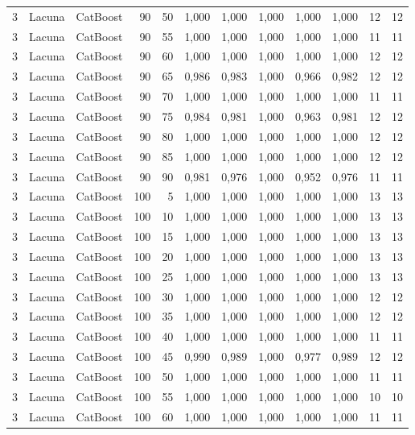 \begin{longtable}{@{}rllrrrrrrrrr@{}}
3 & Lacuna & CatBoost & 90 & 50 & 1,000 & 1,000 & 1,000 & 1,000 & 1,000 & 12 & 12 \\
3 & Lacuna & CatBoost & 90 & 55 & 1,000 & 1,000 & 1,000 & 1,000 & 1,000 & 11 & 11 \\
3 & Lacuna & CatBoost & 90 & 60 & 1,000 & 1,000 & 1,000 & 1,000 & 1,000 & 12 & 12 \\
3 & Lacuna & CatBoost & 90 & 65 & 0,986 & 0,983 & 1,000 & 0,966 & 0,982 & 12 & 12 \\
3 & Lacuna & CatBoost & 90 & 70 & 1,000 & 1,000 & 1,000 & 1,000 & 1,000 & 11 & 11 \\
3 & Lacuna & CatBoost & 90 & 75 & 0,984 & 0,981 & 1,000 & 0,963 & 0,981 & 12 & 12 \\
3 & Lacuna & CatBoost & 90 & 80 & 1,000 & 1,000 & 1,000 & 1,000 & 1,000 & 12 & 12 \\
3 & Lacuna & CatBoost & 90 & 85 & 1,000 & 1,000 & 1,000 & 1,000 & 1,000 & 12 & 12 \\
3 & Lacuna & CatBoost & 90 & 90 & 0,981 & 0,976 & 1,000 & 0,952 & 0,976 & 11 & 11 \\
3 & Lacuna & CatBoost & 100 & 5 & 1,000 & 1,000 & 1,000 & 1,000 & 1,000 & 13 & 13 \\
3 & Lacuna & CatBoost & 100 & 10 & 1,000 & 1,000 & 1,000 & 1,000 & 1,000 & 13 & 13 \\
3 & Lacuna & CatBoost & 100 & 15 & 1,000 & 1,000 & 1,000 & 1,000 & 1,000 & 13 & 13 \\
3 & Lacuna & CatBoost & 100 & 20 & 1,000 & 1,000 & 1,000 & 1,000 & 1,000 & 13 & 13 \\
3 & Lacuna & CatBoost & 100 & 25 & 1,000 & 1,000 & 1,000 & 1,000 & 1,000 & 13 & 13 \\
3 & Lacuna & CatBoost & 100 & 30 & 1,000 & 1,000 & 1,000 & 1,000 & 1,000 & 12 & 12 \\
3 & Lacuna & CatBoost & 100 & 35 & 1,000 & 1,000 & 1,000 & 1,000 & 1,000 & 12 & 12 \\
3 & Lacuna & CatBoost & 100 & 40 & 1,000 & 1,000 & 1,000 & 1,000 & 1,000 & 11 & 11 \\
3 & Lacuna & CatBoost & 100 & 45 & 0,990 & 0,989 & 1,000 & 0,977 & 0,989 & 12 & 12 \\
3 & Lacuna & CatBoost & 100 & 50 & 1,000 & 1,000 & 1,000 & 1,000 & 1,000 & 11 & 11 \\
3 & Lacuna & CatBoost & 100 & 55 & 1,000 & 1,000 & 1,000 & 1,000 & 1,000 & 10 & 10 \\
3 & Lacuna & CatBoost & 100 & 60 & 1,000 & 1,000 & 1,000 & 1,000 & 1,000 & 11 & 11 \\

\end{longtable}
